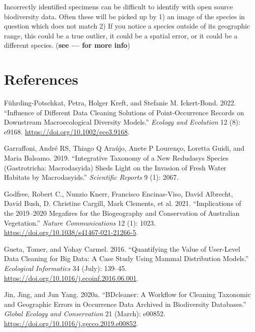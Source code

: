 \documentclass[
  letterpaper,
  DIV=11,
  numbers=noendperiod,
  oneside]{scrreprt}
\newlength{\cslhangindent}
\newlength{\cslentryspacingunit} %
\newenvironment{CSLReferences}[2] %
 {%
  \setlength{\parindent}{0pt}
  \ifodd #1
  \let\oldpar\par
  \def\par{\hangindent=\cslhangindent\oldpar}
  \fi
  \setlength{\parskip}{#2\cslentryspacingunit}
 }%
 {}
\begin{document}
Incorrectly identified specimens can be difficult to identify with open
source biodiversity data. Often these will be picked up by 1) an image
of the species in question which does not match 2) If you notice a
species outside of its geographic range, this could be a true outlier,
it could be a spatial error, or it could be a different species.
(\textbf{see --- for more info})


\hypertarget{sec-references}{%
\chapter{References}\label{sec-references}}

\hypertarget{refs}{}
\begin{CSLReferences}{1}{0}
\leavevmode{}%
Führding-Potschkat, Petra, Holger Kreft, and Stefanie M. Ickert-Bond.
2022. {``Influence of Different Data Cleaning Solutions of
Point-Occurrence Records on Downstream Macroecological Diversity
Models.''} \emph{Ecology and Evolution} 12 (8): e9168.
\url{https://doi.org/10.1002/ece3.9168}.

\leavevmode{}%
Garraffoni, André RS, Thiago Q Araújo, Anete P Lourenço, Loretta Guidi,
and Maria Balsamo. 2019. {``Integrative Taxonomy of a New Redudasys
Species (Gastrotricha: Macrodasyida) Sheds Light on the Invasion of
Fresh Water Habitats by Macrodasyids.''} \emph{Scientific Reports} 9
(1): 2067.

\leavevmode{}%
Godfree, Robert C., Nunzio Knerr, Francisco Encinas-Viso, David
Albrecht, David Bush, D. Christine Cargill, Mark Clements, et al. 2021.
{``Implications of the 2019--2020 Megafires for the Biogeography and
Conservation of {Australian} Vegetation.''} \emph{Nature Communications}
12 (1): 1023. \url{https://doi.org/10.1038/s41467-021-21266-5}.

\leavevmode{}%
Gueta, Tomer, and Yohay Carmel. 2016. {``Quantifying the Value of
User-Level Data Cleaning for Big Data: {A} Case Study Using Mammal
Distribution Models.''} \emph{Ecological Informatics} 34 (July):
139--45. \url{https://doi.org/10.1016/j.ecoinf.2016.06.001}.

\leavevmode{}%
Jin, Jing, and Jun Yang. 2020a. {``{BDcleaner}: {A} Workflow for
Cleaning Taxonomic and Geographic Errors in Occurrence Data Archived in
Biodiversity Databases.''} \emph{Global Ecology and Conservation} 21
(March): e00852. \url{https://doi.org/10.1016/j.gecco.2019.e00852}.


\end{CSLReferences}
\end{document}
